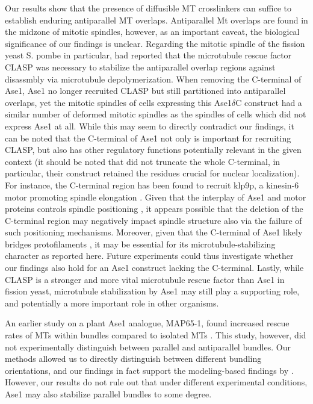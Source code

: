 Our results show that the presence of diffusible MT crosslinkers can suffice to establish enduring antiparallel MT overlaps. Antiparallel Mt overlaps are found in the midzone of mitotic spindles, however, as an important caveat, the biological significance of our findings is unclear. Regarding the mitotic spindle of the fission yeast S. pombe in particular, \cite{Bratman2007b} had reported that the microtubule rescue factor CLASP was necessary to stabilize the antiparallel overlap regions against disassmbly via microtubule depolymerization. When removing the C-terminal of Ase1, Ase1 no longer recruited CLASP but still partitioned into antiparallel overlaps, yet the mitotic spindles of cells expressing this Ase1$\delta$C construct had a similar number of deformed mitotic spindles as the spindles of cells which did not express Ase1 at all. While this may seem to directly contradict our findings, it can be noted that the C-terminal of Ase1 not only is important for recruiting CLASP, but also has other regulatory functions potentially relevant in the given context (it should be noted that \cite{Bratman2007b} did not truncate the whole C-terminal, in particular, their construct retained the residues crucial for nuclear localization). For instance, the C-terminal region has been found to recruit klp9p, a kinesin-6 motor promoting spindle elongation . Given that the interplay of Ase1 and motor proteins controls spindle positioning , it appears possible that the deletion of the C-terminal region may negatively impact spindle structure also via the failure of such positioning mechanisms. Moreover, given that the C-terminal of Ase1 likely bridges protofilaments , it may be essential for its microtubule-stabilizing character as reported here.  Future experiments could thus investigate whether our findings also hold for an Ase1 construct lacking the C-terminal. Lastly, while CLASP is a stronger and more vital microtubule rescue factor than Ase1 in fission yeast, microtubule stabilization by Ase1 may still play a supporting role, and potentially a more important role in other organisms. \par

An earlier study on a plant Ase1 analogue, MAP65-1, found increased rescue rates of MTs within bundles compared to isolated MTs \parencite{Stoppin-Mellet2013}. This study, however, did not experimentally distinguish between parallel and antiparallel bundles. Our methods allowed us to directly distinguish between different bundling orientations, and our findings in fact support the modeling-based findings by \parencite{Stoppin-Mellet2013}. However, our results do not rule out that under different experimental conditions, Ase1 may also stabilize parallel bundles to some degree.\par

